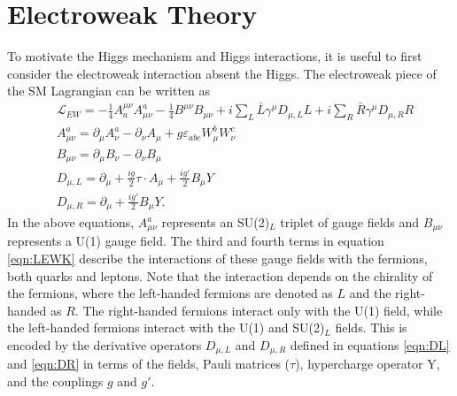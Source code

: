 \section{Electroweak Theory}
To motivate the Higgs mechanism and Higgs interactions, it is useful to first consider the electroweak interaction absent the Higgs. The electroweak piece of the 
SM Lagrangian can be written as 
\begin{align}
	& \mathcal{L}_{EW} = -\frac{1}{4}A_a^{\mu\nu}A^a_{\mu\nu} - \frac{1}{4}B^{\mu\nu}B_{\mu\nu} + i\sum_L \bar{L}\gamma^{\mu}D_{\mu,L}L + i\sum_R \bar{R}\gamma^{\mu}D_{\mu,R}R \label{eqn:LEWK}\\
	& A^a_{\mu\nu} = \partial_{\mu}A_{\nu}^{a} - \partial_{\nu}A_{\mu} + g\varepsilon_{abc}W^{b}_{\mu}W^{c}_{\nu} \\
	& B_{\mu\nu} = \partial_{\mu}B_{\nu} - \partial_{\nu}B_{\mu} \\
	& D_{\mu,L} = \partial_{\mu} + \frac{ig}{2}\tau\cdot A_{\mu} + \frac{ig'}{2}B_{\mu}Y \label{eqn:DL}\\
	& D_{\mu,R} = \partial_{\mu} + \frac{ig'}{2}B_{\mu}Y. \label{eqn:DR}
\end{align}
In the above equations, $A_{\mu\nu}^a$ represents an SU(2)$_L$ triplet of gauge fields and $B_{\mu\nu}$ represents a U(1) gauge field. The third and fourth terms in equation \ref{eqn:LEWK} 
describe the interactions of these gauge fields with the fermions, both quarks and leptons. Note that the interaction depends on the chirality of the fermions, where the left-handed 
fermions are denoted as $L$ and the right-handed as $R$. The right-handed fermions interact only with the U(1) field, while the left-handed fermions interact with the U(1) and SU(2)$_L$ fields. 
This is encoded by the derivative operators $D_{\mu,L}$ and $D_{\mu,R}$ defined in equations \ref{eqn:DL} and \ref{eqn:DR} in terms of the fields, Pauli matrices ($\tau$), hypercharge operator Y, and the couplings $g$ and $g'$. 

